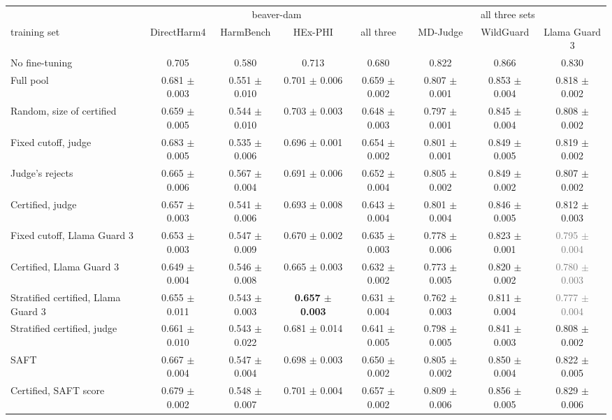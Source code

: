\begin{tabular}{lccccccc}
\toprule
 & \multicolumn{4}{c}{beaver-dam} & \multicolumn{3}{c}{all three sets} \\
\cmidrule(lr){2-5}\cmidrule(lr){6-8}
training set & DirectHarm4 & HarmBench & HEx-PHI & all three & MD-Judge & WildGuard & Llama Guard 3 \\
\midrule
No fine-tuning & 0.705 & 0.580 & 0.713 & 0.680 & 0.822 & 0.866 & 0.830 \\
Full pool & 0.681 $\pm$ 0.003 & 0.551 $\pm$ 0.010 & 0.701 $\pm$ 0.006 & 0.659 $\pm$ 0.002 & 0.807 $\pm$ 0.001 & 0.853 $\pm$ 0.004 & 0.818 $\pm$ 0.002 \\
Random, size of certified & 0.659 $\pm$ 0.005 & 0.544 $\pm$ 0.010 & 0.703 $\pm$ 0.003 & 0.648 $\pm$ 0.003 & 0.797 $\pm$ 0.001 & 0.845 $\pm$ 0.004 & 0.808 $\pm$ 0.002 \\
Fixed cutoff, judge & 0.683 $\pm$ 0.005 & 0.535 $\pm$ 0.006 & 0.696 $\pm$ 0.001 & 0.654 $\pm$ 0.002 & 0.801 $\pm$ 0.001 & 0.849 $\pm$ 0.005 & 0.819 $\pm$ 0.002 \\
Judge's rejects & 0.665 $\pm$ 0.006 & 0.567 $\pm$ 0.004 & 0.691 $\pm$ 0.006 & 0.652 $\pm$ 0.004 & 0.805 $\pm$ 0.002 & 0.849 $\pm$ 0.002 & 0.807 $\pm$ 0.002 \\
Certified, judge & 0.657 $\pm$ 0.003 & 0.541 $\pm$ 0.006 & 0.693 $\pm$ 0.008 & 0.643 $\pm$ 0.004 & 0.801 $\pm$ 0.004 & 0.846 $\pm$ 0.005 & 0.812 $\pm$ 0.003 \\
Fixed cutoff, Llama Guard 3 & 0.653 $\pm$ 0.003 & 0.547 $\pm$ 0.009 & 0.670 $\pm$ 0.002 & 0.635 $\pm$ 0.003 & 0.778 $\pm$ 0.006 & 0.823 $\pm$ 0.001 & \textcolor{gray}{0.795 $\pm$ 0.004} \\
Certified, Llama Guard 3 & 0.649 $\pm$ 0.004 & 0.546 $\pm$ 0.008 & 0.665 $\pm$ 0.003 & 0.632 $\pm$ 0.002 & 0.773 $\pm$ 0.005 & 0.820 $\pm$ 0.002 & \textcolor{gray}{0.780 $\pm$ 0.003} \\
Stratified certified, Llama Guard 3 & 0.655 $\pm$ 0.011 & 0.543 $\pm$ 0.003 & \textbf{0.657 $\pm$ 0.003} & 0.631 $\pm$ 0.004 & 0.762 $\pm$ 0.003 & 0.811 $\pm$ 0.004 & \textcolor{gray}{0.777 $\pm$ 0.004} \\
Stratified certified, judge & 0.661 $\pm$ 0.010 & 0.543 $\pm$ 0.022 & 0.681 $\pm$ 0.014 & 0.641 $\pm$ 0.005 & 0.798 $\pm$ 0.005 & 0.841 $\pm$ 0.003 & 0.808 $\pm$ 0.002 \\
SAFT & 0.667 $\pm$ 0.004 & 0.547 $\pm$ 0.004 & 0.698 $\pm$ 0.003 & 0.650 $\pm$ 0.002 & 0.805 $\pm$ 0.002 & 0.850 $\pm$ 0.004 & 0.822 $\pm$ 0.005 \\
Certified, SAFT score & 0.679 $\pm$ 0.002 & 0.548 $\pm$ 0.007 & 0.701 $\pm$ 0.004 & 0.657 $\pm$ 0.002 & 0.809 $\pm$ 0.006 & 0.856 $\pm$ 0.005 & 0.829 $\pm$ 0.006 \\

\end{tabular}
